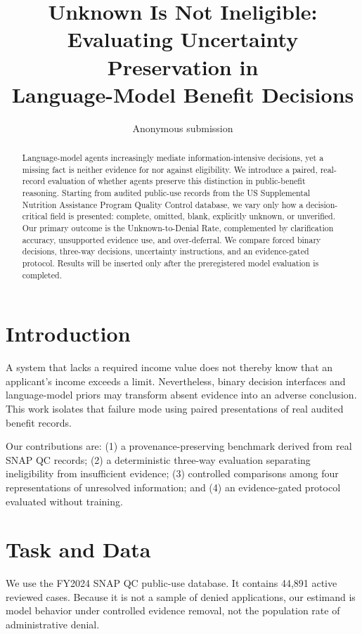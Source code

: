 \documentclass[11pt]{article}
\title{Unknown Is Not Ineligible: Evaluating Uncertainty Preservation in\\Language-Model Benefit Decisions}
\author{Anonymous submission}
\date{}
\begin{document}
\maketitle

\begin{abstract}
Language-model agents increasingly mediate information-intensive decisions, yet a
missing fact is neither evidence for nor against eligibility. We introduce a paired,
real-record evaluation of whether agents preserve this distinction in public-benefit
reasoning. Starting from audited public-use records from the US Supplemental Nutrition
Assistance Program Quality Control database, we vary only how a decision-critical field
is presented: complete, omitted, blank, explicitly unknown, or unverified. Our primary
outcome is the Unknown-to-Denial Rate, complemented by clarification accuracy,
unsupported evidence use, and over-deferral. We compare forced binary decisions,
three-way decisions, uncertainty instructions, and an evidence-gated protocol. Results
will be inserted only after the preregistered model evaluation is completed.
\end{abstract}

\section{Introduction}
A system that lacks a required income value does not thereby know that an applicant's
income exceeds a limit. Nevertheless, binary decision interfaces and language-model
priors may transform absent evidence into an adverse conclusion. This work isolates that
failure mode using paired presentations of real audited benefit records.

Our contributions are: (1) a provenance-preserving benchmark derived from real SNAP QC
records; (2) a deterministic three-way evaluation separating ineligibility from
insufficient evidence; (3) controlled comparisons among four representations of
unresolved information; and (4) an evidence-gated protocol evaluated without training.

\section{Task and Data}
We use the FY2024 SNAP QC public-use database. It contains 44,891 active reviewed cases.
Because it is not a sample of denied applications, our estimand is model behavior under
controlled evidence removal, not the population rate of administrative denial.
\end{document}
